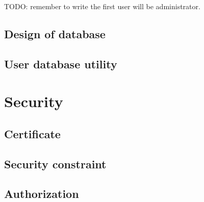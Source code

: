 \textsf{TODO: remember to write the first user will be administrator.}


\subsection{Design of database}
\label{sec:WebApplication:Database:DesignOfDatabase}

\subsection{User database utility}
\label{sec:WebApplication:Database:UserDatabaseUtility}

\section{Security}
\label{sec:WebApplication:Security}

\subsection{Certificate}
\label{sec:WebApplication:Security:Certificate}

\subsection{Security constraint}
\label{sec:WebApplication:Security:SecurityConstraint}

\subsection{Authorization}
\label{sec:WebApplication:Authorization}

